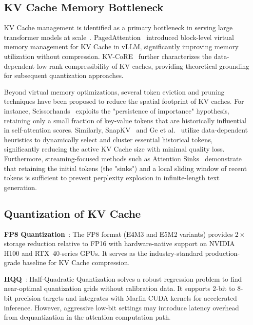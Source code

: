\documentclass[10pt,twocolumn]{article}
\begin{document}
\subsection{KV Cache Memory Bottleneck}

KV Cache management is identified as a primary bottleneck in
serving large transformer models at scale~\cite{kwon2023pagedattention}.
PagedAttention~\cite{kwon2023pagedattention} introduced block-level
virtual memory management for KV Cache in vLLM,
significantly improving memory utilization without compression.
KV-CoRE~\cite{chen2026kvcore} further characterizes the
data-dependent low-rank compressibility of KV caches,
providing theoretical grounding for subsequent quantization approaches.

Beyond virtual memory optimizations, several token eviction and pruning techniques
have been proposed to reduce the spatial footprint of KV caches. For instance,
Scissorhands~\cite{Liu2023Scissorhands} exploits the "persistence of importance"
hypothesis, retaining only a small fraction of key-value tokens that are historically
influential in self-attention scores.
Similarly, SnapKV~\cite{Li2024SnapKV} and Ge et al.~\cite{Ge2023Model} utilize
data-dependent heuristics to dynamically select and cluster essential historical tokens,
significantly reducing the active KV Cache size with minimal quality loss.
Furthermore, streaming-focused methods such as Attention Sinks~\cite{Xiao2023Efficient}
demonstrate that retaining the initial tokens (the "sinks") and a local sliding window of
recent tokens is sufficient to prevent perplexity explosion in infinite-length text generation.

\subsection{Quantization of KV Cache}

\noindent\textbf{FP8 Quantization}~\cite{micikevicius2022fp8}:
The FP8 format (E4M3 and E5M2 variants) provides $2\times$ storage
reduction relative to FP16 with hardware-native support on
NVIDIA H100 and RTX~40-series GPUs.
It serves as the industry-standard production-grade baseline
for KV Cache compression.

\noindent\textbf{HQQ}~\cite{badri2023hqq}:
Half-Quadratic Quantization solves a robust regression problem
to find near-optimal quantization grids without calibration data.
It supports 2-bit to 8-bit precision targets and integrates with
Marlin CUDA kernels for accelerated inference.
However, aggressive low-bit settings may introduce latency overhead
from dequantization in the attention computation path.
\end{document}
